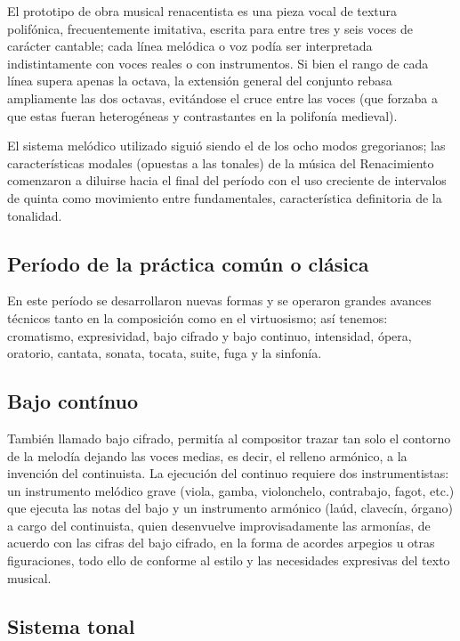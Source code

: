 El prototipo de obra musical renacentista es una pieza vocal de textura polifónica,
frecuentemente imitativa, escrita para entre tres y seis voces de carácter cantable; cada
línea melódica o voz podía ser interpretada indistintamente con voces reales o con
instrumentos. Si bien el rango de cada línea supera apenas la octava, la extensión general
del conjunto rebasa ampliamente las dos octavas, evitándose el cruce entre las voces (que
forzaba a que estas fueran heterogéneas y contrastantes en la polifonía medieval).

El sistema melódico utilizado siguió siendo el de los ocho modos gregorianos; las
características modales (opuestas a las tonales) de la música del Renacimiento comenzaron
a diluirse hacia el final del período con el uso creciente de intervalos de quinta como
movimiento entre fundamentales, característica definitoria de la tonalidad.


\subsection{Período de la práctica común o clásica}

En este período se desarrollaron nuevas formas y se operaron grandes avances técnicos
tanto en la composición como en el virtuosismo; así tenemos: cromatismo, expresividad,
bajo cifrado y bajo continuo, intensidad, ópera, oratorio, cantata, sonata, tocata, suite,
fuga y la sinfonía.


\subsection{Bajo contínuo}

También llamado bajo cifrado, permitía al compositor trazar tan solo el contorno de la
melodía  dejando las voces medias, es decir, el relleno armónico, a la invención del
continuista. La ejecución del continuo requiere dos instrumentistas: un instrumento
melódico grave (viola, gamba, violonchelo, contrabajo, fagot, etc.) que ejecuta las notas
del bajo y un instrumento armónico (laúd, clavecín, órgano) a cargo del continuista, quien
 desenvuelve improvisadamente las armonías, de acuerdo con las cifras del bajo cifrado, en
 la forma de acordes arpegios u otras figuraciones, todo ello de conforme al estilo y las
 necesidades expresivas del texto musical.


\subsection{Sistema tonal}

